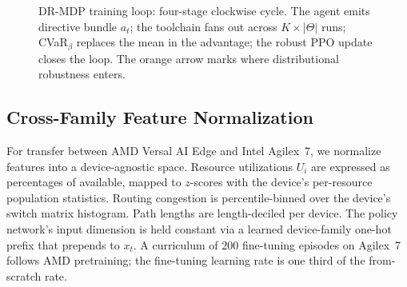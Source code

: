 \documentclass[journal]{IEEEtran}
\begin{document}
\begin{figure}[t]
\caption{DR-MDP training loop: four-stage clockwise cycle. The agent emits directive bundle $a_t$; the toolchain fans out across $K{\times}|\Theta|$ runs; CVaR$_\beta$ replaces the mean in the advantage; the robust PPO update closes the loop. The orange arrow marks where distributional robustness enters.}
\label{fig:rlloop}
\end{figure}

\subsection{Cross-Family Feature Normalization}
For transfer between AMD Versal AI Edge and Intel Agilex~7, we normalize features into a device-agnostic space. Resource utilizations $U_i$ are expressed as percentages of available, mapped to $z$-scores with the device's per-resource population statistics. Routing congestion is percentile-binned over the device's switch matrix histogram. Path lengths are length-deciled per device. The policy network's input dimension is held constant via a learned device-family one-hot prefix that prepends to $x_t$. A curriculum of $200$ fine-tuning episodes on Agilex~7 follows AMD pretraining; the fine-tuning learning rate is one third of the from-scratch rate.
\end{document}
